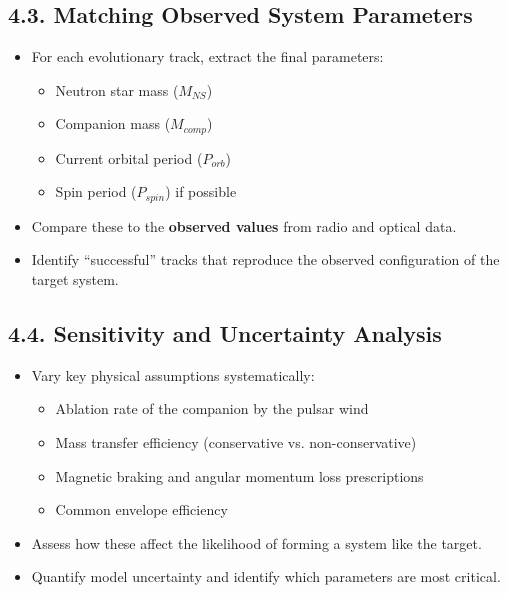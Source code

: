 \documentclass[12pt]{article}
\begin{document}
\subsection*{4.3. Matching Observed System Parameters}
\begin{itemize}
    \item For each evolutionary track, extract the final parameters:
        \begin{itemize}
            \item Neutron star mass ($M_{NS}$)
            \item Companion mass ($M_{comp}$)
            \item Current orbital period ($P_{orb}$)
            \item Spin period ($P_{spin}$) if possible
        \end{itemize}
    \item Compare these to the \textbf{observed values} from radio and optical data.
    \item Identify “successful” tracks that reproduce the observed configuration of the target system.
\end{itemize}

\subsection*{4.4. Sensitivity and Uncertainty Analysis}
\begin{itemize}
    \item Vary key physical assumptions systematically:
        \begin{itemize}
            \item Ablation rate of the companion by the pulsar wind
            \item Mass transfer efficiency (conservative vs. non-conservative)
            \item Magnetic braking and angular momentum loss prescriptions
            \item Common envelope efficiency
        \end{itemize}
    \item Assess how these affect the likelihood of forming a system like the target.
    \item Quantify model uncertainty and identify which parameters are most critical.
\end{itemize}
\end{document}
